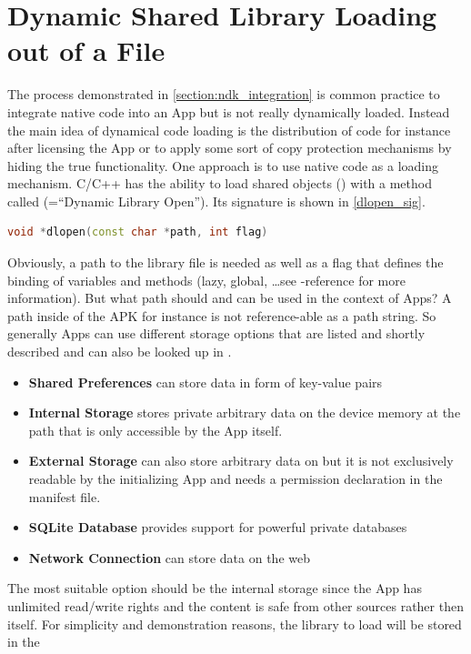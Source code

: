 \section{Dynamic Shared Library Loading out of a File}\label{section:shared_library_loading}
The process demonstrated in \autoref{section:ndk_integration} is common practice to
integrate native code into an App but is not really dynamically loaded. Instead
the main idea of dynamical code loading is the distribution of code for instance
after licensing the App or to apply some sort of copy protection mechanisms by hiding
the true functionality. One approach is to use native code as a loading mechanism.
C/C++ has the ability to load shared objects () with a method called
 (=``Dynamic Library Open''). Its signature is shown in \autoref{dlopen_sig}.
\begin{lstlisting}[language=C++, caption=dlopen() Signature, label=dlopen_sig]
void *dlopen(const char *path, int flag)
\end{lstlisting}
Obviously, a path to the library file is needed as well as a flag that defines the binding of variables and methods (lazy, global, \ldots see -reference for more information).
But what path should and can be used in the context of Apps? A path inside of the APK
for instance is not reference-able as a path string. So generally Apps can use different storage options that are listed and shortly described and can also be looked up in
\parencite{storage_options}.
\begin{itemize}
\item \textbf{Shared Preferences} can store data in form of key-value pairs
\item \textbf{Internal Storage} stores private arbitrary data on the device memory at the path
  that is only accessible by the App itself.
\item \textbf{External Storage} can also store arbitrary data on  but it is not exclusively readable by the initializing App and needs a permission declaration in
the manifest file.
\item \textbf{SQLite Database} provides support for powerful private databases
\item \textbf{Network Connection} can store data on the web
\end{itemize}
The most suitable option should be the internal storage since the App has unlimited read/write rights and the content is safe from other sources rather then itself. For simplicity and demonstration reasons, the library to load will be stored in the
